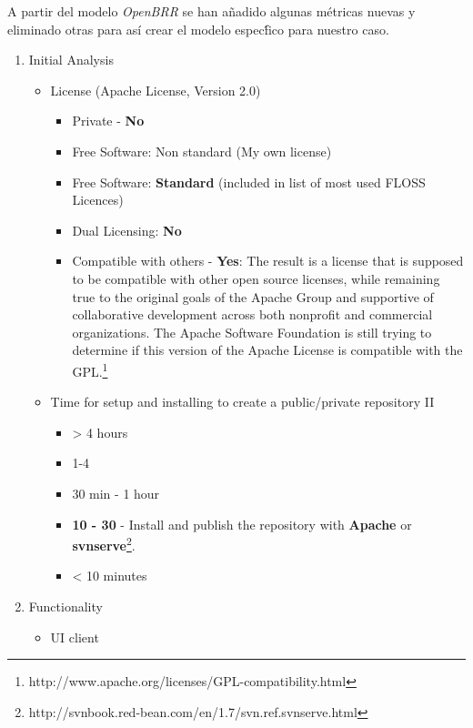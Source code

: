 \documentclass[11pt]{scrartcl}
\begin{document}
\par A partir del modelo \emph{OpenBRR} se han a\~nadido algunas m\'etricas nuevas y eliminado otras para así crear el modelo espec\'fico para nuestro caso.

\begin{enumerate}
    \item Initial Analysis
    \begin{itemize}
        \item License (Apache License, Version 2.0)
        \begin{itemize} 
            \item Private - \textbf{No}
            \item Free Software: Non standard (My own license)
            \item Free Software: \textbf{Standard} (included in list of most used FLOSS Licences)
            \item Dual Licensing: \textbf{No}
            \item Compatible with others - \textbf{Yes}: The result is a license that is supposed to be compatible with other open source licenses, while remaining true to the original goals of the Apache Group and supportive of collaborative development across both nonprofit and commercial organizations. The Apache Software Foundation is still trying to determine if this version of the Apache License is compatible with the GPL.\footnote{http://www.apache.org/licenses/GPL-compatibility.html}    
        \end{itemize}
	    \item Time for setup and installing to create a public/private repository II
        \begin{itemize}
            \item \textgreater
 4 hours
            \item 1-4 
            \item 30 min - 1 hour
            \item \textbf{10 - 30} - Install and publish the repository with \textbf{Apache} or \textbf{svnserve}\footnote{http://svnbook.red-bean.com/en/1.7/svn.ref.svnserve.html}.
            \item \textless
 10 minutes
        \end{itemize}
    \end{itemize}
    \item Functionality
        \begin{itemize}
	    \item UI client

\end{itemize}
\end{enumerate}
\end{document}
